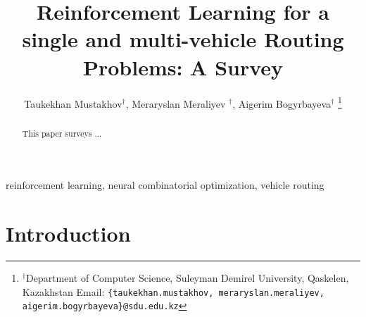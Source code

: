 \documentclass[letterpaper, 10 pt, conference, table]{ieeeconf}  %
\title{\LARGE \bf
Reinforcement Learning for a single and multi-vehicle Routing Problems: A Survey
}
\author{
Taukekhan Mustakhov$^\dag$, Meraryslan Meraliyev $^\dag$, Aigerim Bogyrbayeva$^\dag$
\thanks{$^\dag$Department of Computer Science, Suleyman Demirel University, Qaskelen, Kazakhstan Email: {\tt\footnotesize\{taukekhan.mustakhov, meraryslan.meraliyev, aigerim.bogyrbayeva\}@sdu.edu.kz}}%
}
\newcommand{\rednote}[1]{{\color{red}#1}}
\begin{document}
\maketitle
\thispagestyle{plain}
\pagestyle{plain}



\begin{abstract}
This paper surveys ...
\end{abstract}

\begin{keywords}
	reinforcement learning, neural combinatorial optimization, vehicle routing
\end{keywords}


\section{Introduction}




\clearpage


\end{document}
